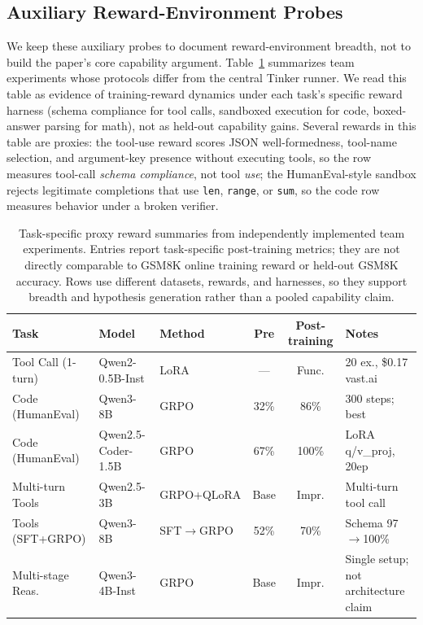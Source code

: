 \documentclass{article}
\begin{document}
\subsection{Auxiliary Reward-Environment Probes}
\label{sec:task_grpo}

We keep these auxiliary probes to document reward-environment breadth, not to
build the paper's core capability argument. Table~\ref{tab:task_grpo}
summarizes team experiments whose protocols differ from the central Tinker
runner.  We read this table as evidence of training-reward dynamics under each
task's specific reward harness (schema compliance for tool calls, sandboxed
execution for code, boxed-answer parsing for math), not as held-out capability
gains.
Several rewards in this table are proxies: the tool-use reward scores JSON
well-formedness, tool-name selection, and argument-key presence without
executing tools, so the row measures tool-call \emph{schema compliance}, not
tool \emph{use}; the HumanEval-style sandbox rejects legitimate completions
that use \texttt{len}, \texttt{range}, or \texttt{sum}, so the code row
measures behavior under a broken verifier.

\begin{table}[t]
\centering
\caption{Task-specific proxy reward summaries from independently implemented team experiments. Entries report task-specific post-training metrics; they are not directly comparable to GSM8K online training reward or held-out GSM8K accuracy. Rows use different datasets, rewards, and harnesses, so they support breadth and hypothesis generation rather than a pooled capability claim.}
\label{tab:task_grpo}
\footnotesize
\begin{tabular}{@{}l l l c c p{2.8cm}@{}}
\toprule
\textbf{Task} & \textbf{Model} & \textbf{Method} & \textbf{Pre} & \textbf{Post-training} & \textbf{Notes} \\
\midrule
Tool Call (1-turn) & Qwen2-0.5B-Inst & LoRA & --- & Func. & 20 ex., \$0.17 vast.ai \\
Code (HumanEval) & Qwen3-8B & GRPO & 32\% & 86\% & 300 steps; best \\
Code (HumanEval) & Qwen2.5-Coder-1.5B & GRPO & 67\% & 100\% & LoRA q/v\_proj, 20ep \\
Multi-turn Tools & Qwen2.5-3B & GRPO+QLoRA & Base & Impr. & Multi-turn tool call \\
Tools (SFT+GRPO) & Qwen3-8B & SFT$\to$GRPO & 52\% & 70\% & Schema 97$\to$100\% \\
Multi-stage Reas. & Qwen3-4B-Inst & GRPO & Base & Impr. & Single setup; not architecture claim \\
\bottomrule
\end{tabular}
\end{table}
\end{document}
